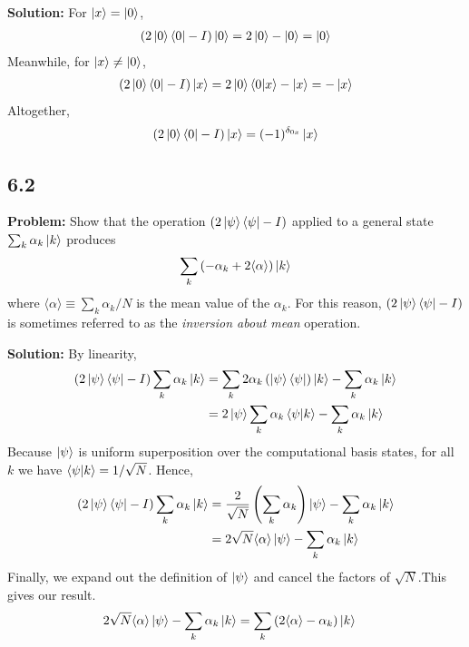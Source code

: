 \documentclass{article}
\begin{document}
\textbf{Solution:} For $\ket{x} = \ket{0}$,
\begin{align}
    (2\ket{0}\bra{0}-I)\ket{0} = 2\ket{0}-\ket{0} = \ket{0}
\end{align}
Meanwhile, for $\ket{x} \neq \ket{0}$,
\begin{align}
    (2\ket{0}\bra{0}-I)\ket{x} = 2\ket{0}\braket{0}{x}-\ket{x} = -\ket{x}
\end{align}
Altogether,
\begin{align}
    (2\ket{0}\bra{0}-I)\ket{x} = (-1)^{\delta_{0x}}\ket{x}
\end{align}

\subsection*{6.2}
\textbf{Problem:} Show that the operation $(2\ket{\psi}\bra{\psi}-I)$ applied to a general state $\sum_k \alpha_k \ket{k}$ produces
\begin{align}
    \sum_k \left(-\alpha_k+2\langle\alpha\rangle\right)\ket{k}
\end{align}
where $\langle\alpha\rangle \equiv \sum_k\alpha_k/N$ is the mean value of the $\alpha_k$. For this reason, $(2\ket{\psi}\bra{\psi}-I)$ is sometimes referred to as the \emph{inversion about mean} operation.

\textbf{Solution:} By linearity,
\begin{align*}
    (2\ket{\psi}\bra{\psi}-I)\sum_k \alpha_k\ket{k} &= \sum_k 2 \alpha_k\left(\ket{\psi}\bra{\psi}\right)\ket{k} - \sum_k \alpha_k\ket{k} \\
    &= 2\ket{\psi}\sum_k\alpha_k\braket{\psi}{k}-\sum_k\alpha_k\ket{k}
\end{align*}
Because $\ket{\psi}$ is uniform superposition over the computational basis states, for all $k$ we have $\braket{\psi}{k}=1/\sqrt{N}$. Hence,
\begin{align}
(2\ket{\psi}\bra{\psi}-I)\sum_k \alpha_k\ket{k} &= \frac{2}{\sqrt{N}}\left(\sum_k\alpha_k\right)\ket{\psi} - \sum_k \alpha_k\ket{k} \\
&= 2\sqrt{N} \langle\alpha\rangle\ket{\psi} - \sum_k\alpha_k\ket{k}
\end{align}
Finally, we expand out the definition of $\ket{\psi}$ and cancel the factors of $\sqrt{N}$.This gives our result. 
\begin{align}
    2\sqrt{N} \langle\alpha\rangle\ket{\psi} - \sum_k\alpha_k\ket{k} &= \sum_k\left(2\langle\alpha\rangle-\alpha_k\right)\ket{k}
\end{align}
\end{document}

